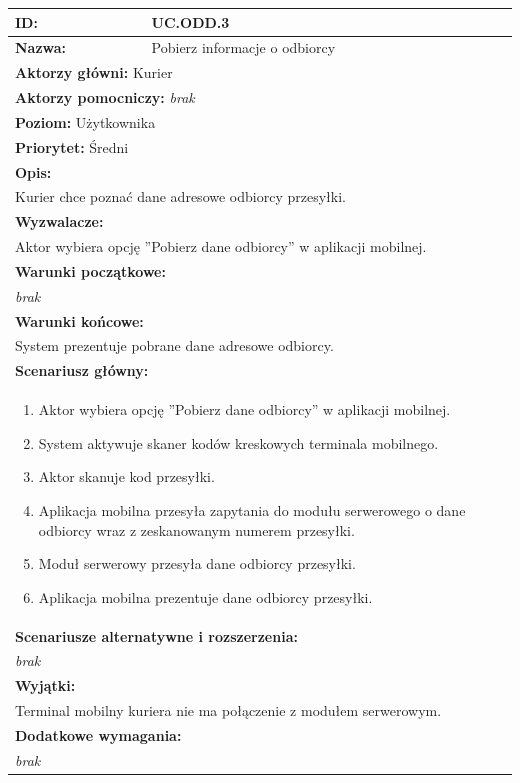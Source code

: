 \begin{center}
\begin{longtable}[h]{|p{1.6cm}|p{13.5cm}|}
\hline
\textbf{ID:} & UC.ODD.3 \\ \hline
\textbf{Nazwa:} & Pobierz informacje o odbiorcy \\ \hline
\multicolumn{2}{|p{15.1cm}|}{\textbf{Aktorzy główni:} Kurier} \\
\multicolumn{2}{|p{15.1cm}|}{\textbf{Aktorzy pomocniczy:} 
\textit{brak}} \\
\multicolumn{2}{|p{15.1cm}|}{\textbf{Poziom:} Użytkownika} \\
\multicolumn{2}{|p{15.1cm}|}{\textbf{Priorytet:} Średni} \\
\hline
\multicolumn{2}{|p{15.1cm}|}{\textbf{Opis:}} \\
\multicolumn{2}{|p{15.1cm}|}{
Kurier chce poznać dane adresowe odbiorcy przesyłki.
} \\ \hline
\multicolumn{2}{|p{15.1cm}|}{\textbf{Wyzwalacze:}} \\
\multicolumn{2}{|p{15.1cm}|}{
Aktor wybiera opcję ''Pobierz dane odbiorcy'' w aplikacji mobilnej.
} \\ \hline
\multicolumn{2}{|p{15.1cm}|}{\textbf{Warunki początkowe:}} \\
\multicolumn{2}{|p{15.1cm}|}{
\textit{brak}
} \\ \hline
\multicolumn{2}{|p{15.1cm}|}{\textbf{Warunki końcowe:}} \\
\multicolumn{2}{|p{15.1cm}|}{
System prezentuje pobrane dane adresowe odbiorcy.
} \\ \hline
\multicolumn{2}{|p{15.1cm}|}{\textbf{Scenariusz główny:}} \\
\multicolumn{2}{|p{15.1cm}|}{
\begin{enumerate}
\item Aktor wybiera opcję ''Pobierz dane odbiorcy'' w aplikacji mobilnej.
\item System aktywuje skaner kodów kreskowych terminala mobilnego.
\item Aktor skanuje kod przesyłki.
\item Aplikacja mobilna przesyła zapytania do modułu serwerowego o dane odbiorcy wraz z zeskanowanym numerem przesyłki.
\item Moduł serwerowy przesyła dane odbiorcy przesyłki.
\item Aplikacja mobilna prezentuje dane odbiorcy przesyłki.
\end{enumerate}
} \\ \hline
\multicolumn{2}{|p{15.1cm}|}{\textbf{Scenariusze alternatywne i rozszerzenia:}} \\
\multicolumn{2}{|p{15.1cm}|}{
\textit{brak}
} \\ \hline
\multicolumn{2}{|p{15.1cm}|}{\textbf{Wyjątki:}} \\
\multicolumn{2}{|p{15.1cm}|}{
Terminal mobilny kuriera nie ma połączenie z modułem serwerowym.
} \\ \hline
\multicolumn{2}{|p{15.1cm}|}{\textbf{Dodatkowe wymagania:}} \\
\multicolumn{2}{|p{15.1cm}|}{
\textit{brak}
} \\
\hline
\end{longtable}
\end{center}
